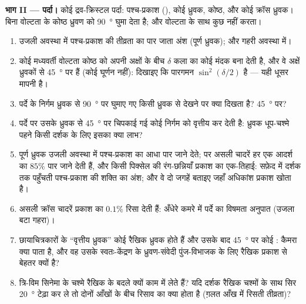 \begin{problem}
\medskip
\noindent\textbf{भाग II --- पर्दा।}
कोई द्रव-क्रिस्टल पर्दा: पश्च-प्रकाश (), कोई ध्रुवक,
कोष्ठ, और कोई क्रॉस ध्रुवक। बिना वोल्टता के कोष्ठ ध्रुवण को
\qty{90}{\degree} घुमा देता है; और वोल्टता के साथ कुछ नहीं करता।
\begin{enumerate}[resume]
  \item उजली अवस्था में पश्च-प्रकाश की तीव्रता का पार जाता
        अंश (पूर्ण ध्रुवक); और गहरी अवस्था में।
  \item कोई मध्यवर्ती वोल्टता कोष्ठ को अपनी अक्षों के बीच $\delta$ कला का
        कोई मंदक बना देती है, और वे अक्षें ध्रुवकों से \qty{45}{\degree} पर हैं
        (कोई घूर्णन नहीं): दिखाइए कि पारगमन
        $\sin^2(\delta/2)$ है --- यही धूसर मापनी है।
  \item पर्दे के निर्गम ध्रुवक से \qty{90}{\degree} पर घुमाए गए किसी ध्रुवक से
        देखने पर क्या दिखता है? \qty{45}{\degree} पर?
  \item पर्दे पर उसके ध्रुवक से \qty{45}{\degree} पर चिपकाई गई कोई
         निर्गम को वृत्तीय कर देती है: ध्रुवक धूप-चश्मे
        पहने किसी दर्शक के लिए इसका क्या लाभ?
  \item पूर्ण ध्रुवक उजली अवस्था में पश्च-प्रकाश का आधा पार जाने देते;
        पर असली चादरें हर एक आदर्श का $85\%$ पार जाने देती हैं, और
        किसी पिक्सेल की रंग-छन्नियाँ प्रकाश का एक-तिहाई:
        सफ़ेद में दर्शक तक पहुँचती पश्च-प्रकाश की शक्ति का अंश;
        और वे दो जगहें बताइए जहाँ अधिकांश प्रकाश खोता है।
  \item असली क्रॉस चादरें प्रकाश का $0.1\%$ रिसा देती हैं: अँधेरे कमरे में
        पर्दे का विषमता अनुपात (उजला बटा गहरा)।
  \item छायाचित्रकारों के ``वृत्तीय ध्रुवक'' कोई रैखिक ध्रुवक होते हैं
        और उसके बाद \qty{45}{\degree} पर कोई : कैमरा क्या
        पाता है, और वह उसके स्वतः-केंद्रण के ध्रुवण-संवेदी
        पुंज-विभाजक के लिए रैखिक प्रकाश से बेहतर क्यों है?
  \item त्रि-विम सिनेमा के चश्मे रैखिक के बदले  क्यों
        काम में लेते हैं? यदि दर्शक रैखिक चश्मों के साथ सिर \qty{20}{\degree}
        टेढ़ा कर ले तो दोनों आँखों के बीच रिसाव का
        क्या होता है (ग़लत आँख में रिसती तीव्रता)?
\end{enumerate}


\end{problem}
